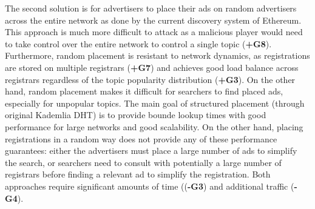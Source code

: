 The second solution is for  advertisers to place their ads on random advertisers across the entire network as done by the current discovery system of Ethereum. This approach is much more difficult to attack as a malicious player would need to take control over the entire network to control a single topic (\textbf{+G8}). Furthermore, random placement is resistant to network dynamics, as registrations are stored on multiple registrars (\textbf{+G7}) and achieves good load balance across registrars regardless of the topic popularity distribution (\textbf{+G3}). 
On the other hand, random placement makes it difficult for searchers to find placed ads, especially for unpopular topics. The main goal of structured placement (through original Kademlia DHT) is to provide bounde lookup times with good performance for large networks and good scalability. On the other hand, placing registrations in a random way does not provide any of these performance guarantees: either the advertisers must place a large number of ads to simplify the search, or searchers need to consult with potentially a large number of registrars before finding a relevant ad to simplify the registration. 
Both approaches require significant amounts of time ((\textbf{-G3}) and additional traffic (\textbf{-G4}). 
